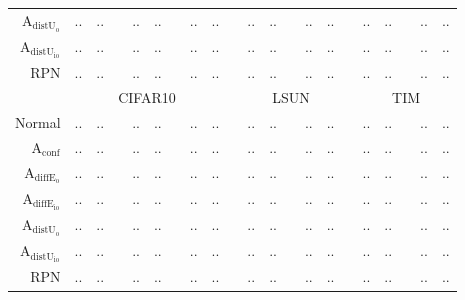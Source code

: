 \begin{table}[ht]
\begin{tiny}
\begin{tabular}{@{}rrrcrrcrrcrrcrrcrrcrr@{}}
			$\mathrm{A}_{\mathrm{distU_{o}}}$  & .. & .. & & .. & .. & & .. & .. & & .. & .. & & .. & .. & & .. & .. & & .. & .. \\
			$\mathrm{A}_{\mathrm{distU_{io}}}$ & .. & .. & & .. & .. & & .. & .. & & .. & .. & & .. & .. & & .. & .. & & .. & .. \\
			RPN                                & .. & .. & & .. & .. & & .. & .. & & .. & .. & & .. & .. & & .. & .. & & .. & .. \\
						\midrule
			& \multicolumn{8}{c}{CIFAR10} & & \multicolumn{5}{c}{LSUN} & & \multicolumn{5}{c}{TIM} \\
			Normal                             & .. & .. & & .. & .. & & .. & .. & & .. & .. & & .. & .. & & .. & .. & & .. & .. \\
			$\mathrm{A}_{\mathrm{conf}}$       & .. & .. & & .. & .. & & .. & .. & & .. & .. & & .. & .. & & .. & .. & & .. & .. \\
			$\mathrm{A}_{\mathrm{diffE_{o}}}$  & .. & .. & & .. & .. & & .. & .. & & .. & .. & & .. & .. & & .. & .. & & .. & .. \\
			$\mathrm{A}_{\mathrm{diffE_{io}}}$ & .. & .. & & .. & .. & & .. & .. & & .. & .. & & .. & .. & & .. & .. & & .. & .. \\
			$\mathrm{A}_{\mathrm{distU_{o}}}$  & .. & .. & & .. & .. & & .. & .. & & .. & .. & & .. & .. & & .. & .. & & .. & .. \\
			$\mathrm{A}_{\mathrm{distU_{io}}}$ & .. & .. & & .. & .. & & .. & .. & & .. & .. & & .. & .. & & .. & .. & & .. & .. \\
			RPN                                & .. & .. & & .. & .. & & .. & .. & & .. & .. & & .. & .. & & .. & .. & & .. & .. \\
			\bottomrule
		\end{tabular}
	\end{tiny}
	\label{tab:res_smoothing}
\end{table}








